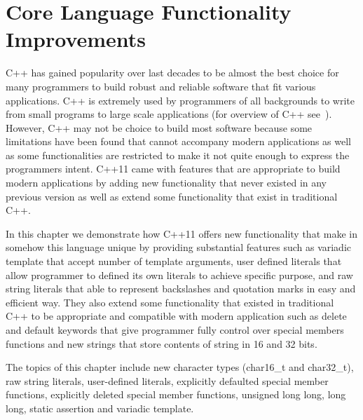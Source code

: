 \documentclass[11pt]{report}
\begin{document}
\chapter{Core Language Functionality Improvements}
\label{chapter: Functionality Improvements}
C++ has gained popularity over last decades to be almost the best choice for many programmers to build robust and reliable software that fit various applications. C++ is extremely used by programmers of all backgrounds to write from small programs to large scale applications (for overview of C++ see~\cite{Stroustrup:2012:Cpp11}). However, C++ may not be choice to build most software because some limitations have been found  that cannot accompany modern applications as well as some functionalities are restricted to make it not quite enough to express the programmers intent. C++11 came with features that are appropriate to build modern applications by adding new functionality that never existed in any previous version  as well as extend some functionality that exist in traditional C++.

In this chapter we demonstrate how C++11 offers new functionality that make in somehow this language unique by providing substantial features such as variadic template that accept number of template arguments, user defined literals that allow programmer to defined its own literals to achieve specific purpose, and raw string literals that able to represent backslashes and quotation marks in easy and efficient way.  They also extend some functionality that existed in traditional C++ to be appropriate and compatible with modern application such as delete and default keywords that give programmer fully control over special members functions and new strings that store contents of string in 16 and 32 bits.

The topics of this chapter include new character types (char16\_t and char32\_t), raw string literals, user-defined literals, explicitly defaulted special member functions, explicitly deleted special member functions, unsigned long long, long long, static assertion and variadic template.
\end{document}
